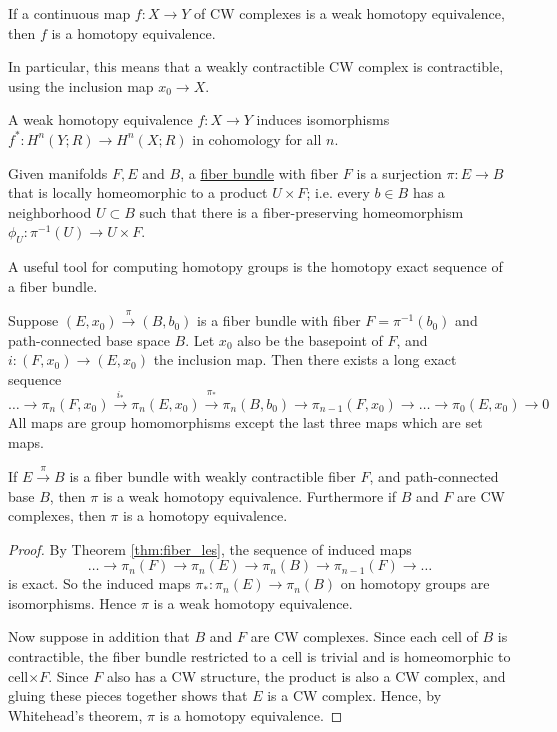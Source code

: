 \begin{thm} 
	If a continuous map $f:X\to Y$ of CW complexes 
	is a weak homotopy equivalence, then  $f$ is a homotopy equivalence. 
\end{thm}
In particular, this
means that a weakly contractible CW complex is contractible, using the inclusion
map $x_0 \to X$. 

\begin{thm} \label{thm:weak_to_cohomology}
	A weak homotopy equivalence $f:X\to Y$ induces isomorphisms
	$f^*:H^n(Y;R)\to H^n(X;R)$ in cohomology for all  $n$.
\end{thm}
\begin{defn}
	Given manifolds $F,E$ and $B$, 
	a \underline{fiber bundle} with fiber $F$ is a surjection  $\pi: E\to B$
	that is locally homeomorphic to a product $U\times F$; i.e. every  $b\in B$
	has a neighborhood  $U\subset B$ such that there is a fiber-preserving
	homeomorphism $\phi_U : \pi^{-1}(U) \to U\times F$.
\end{defn}
A useful tool for computing homotopy groups is the homotopy exact sequence of a
fiber bundle. 
\begin{thm} \label{thm:fiber_les}
	Suppose $(E,x_0) \xrightarrow{\pi} (B,b_0)$ is a fiber bundle with fiber
	$F=\pi^{-1}(b_0)$ and path-connected base space $B$. Let  $x_0$ also be the
	basepoint of $F$, and  $i:(F,x_0)\to (E,x_0)$ the inclusion map. Then there
	exists a long exact sequence
	\[
		\ldots\to\pi_n(F,x_0) \xrightarrow{i_*}\pi_n(E,x_0)
		\overset{\pi_*}{\xrightarrow{}}\pi_n(B,b_0)
		\to \pi_{n-1}(F,x_0)\to\ldots\to\pi_0(E,x_0)\to 0
	\] 
	All maps are group homomorphisms except the last three maps which are set
	maps.
\end{thm}

\begin{prop} \label{prop:total_base_iso}
	If $E \xrightarrow{\pi} B$ is a fiber bundle with weakly contractible fiber $F$,
	and path-connected base $B$, then $\pi$ is a weak homotopy equivalence.
	Furthermore if $B$ and $F$ are CW complexes, 
	then $\pi$ is a homotopy equivalence.  
\end{prop}
\begin{proof}
	By Theorem \ref{thm:fiber_les}, the sequence of induced maps
	\[
	\ldots \to \pi_n(F) \to \pi_n(E) \to\pi_n(B) \to
	\pi_{n-1}(F)\to \ldots
	\] 
	is exact. So the induced maps $\pi_* : \pi_n(E) \to
	\pi_n(B)$ on homotopy groups are isomorphisms. Hence $\pi$ is a weak
	homotopy equivalence. 

	Now suppose in addition that $B$ and $F$ are CW complexes. 
	Since each cell of $B$ is contractible, the fiber bundle
	restricted to a cell is trivial and is homeomorphic to  cell$\times F$. 
	Since  $F$ also has a CW structure, the product is also a CW complex, and
	gluing these pieces together shows that $E$ is a CW complex. Hence, by
	Whitehead's theorem,  $\pi$ is a homotopy equivalence. 
\end{proof}

